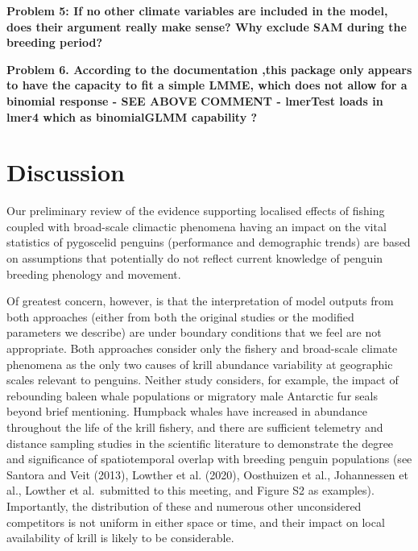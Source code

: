 \documentclass[]{elsarticle} %
\begin{document}
\textbf{Problem 5: If no other climate variables are included in the
model, does their argument really make sense? Why exclude SAM during the
breeding period?}

\textbf{Problem 6. According to the documentation ,this package only
appears to have the capacity to fit a simple LMME, which does not allow
for a binomial response - SEE ABOVE COMMENT - lmerTest loads in lmer4
which as binomialGLMM capability ?}

\hypertarget{discussion}{%
\section{Discussion}\label{discussion}}

Our preliminary review of the evidence supporting localised effects of
fishing coupled with broad-scale climactic phenomena having an impact on
the vital statistics of pygoscelid penguins (performance and demographic
trends) are based on assumptions that potentially do not reflect current
knowledge of penguin breeding phenology and movement.

Of greatest concern, however, is that the interpretation of model
outputs from both approaches (either from both the original studies or
the modified parameters we describe) are under boundary conditions that
we feel are not appropriate. Both approaches consider only the fishery
and broad-scale climate phenomena as the only two causes of krill
abundance variability at geographic scales relevant to penguins. Neither
study considers, for example, the impact of rebounding baleen whale
populations or migratory male Antarctic fur seals beyond brief
mentioning. Humpback whales have increased in abundance throughout the
life of the krill fishery, and there are sufficient telemetry and
distance sampling studies in the scientific literature to demonstrate
the degree and significance of spatiotemporal overlap with breeding
penguin populations (see Santora and Veit (2013), Lowther et al. (2020),
Oosthuizen et al., Johannessen et al., Lowther et al.~submitted to this
meeting, and Figure S2 as examples). Importantly, the distribution of
these and numerous other unconsidered competitors is not uniform in
either space or time, and their impact on local availability of krill is
likely to be considerable.
\end{document}
